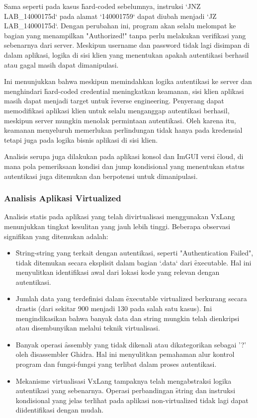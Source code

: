 Sama seperti pada kasus \f{hard-coded} sebelumnya, instruksi `JNZ LAB\_14000175d` pada alamat `140001759` dapat diubah menjadi `JZ LAB\_14000175d`. Dengan perubahan ini, program akan selalu melompat ke bagian yang menampilkan "Authorized!" tanpa perlu melakukan verifikasi yang sebenarnya dari server. Meskipun username dan password tidak lagi disimpan di dalam aplikasi, logika di sisi klien yang menentukan apakah autentikasi berhasil atau gagal masih dapat dimanipulasi.

Ini menunjukkan bahwa meskipun memindahkan logika autentikasi ke server dan menghindari \f{hard-coded credential} meningkatkan keamanan, sisi klien aplikasi masih dapat menjadi target untuk \f{reverse engineering}. Penyerang dapat memodifikasi aplikasi klien untuk selalu menganggap autentikasi berhasil, meskipun server mungkin menolak permintaan autentikasi. Oleh karena itu, keamanan menyeluruh memerlukan perlindungan tidak hanya pada kredensial tetapi juga pada logika bisnis aplikasi di sisi klien.

Analisis serupa juga dilakukan pada aplikasi konsol dan ImGUI versi \f{cloud}, di mana pola pemeriksaan kondisi dan jump kondisional yang menentukan status autentikasi juga ditemukan dan berpotensi untuk dimanipulasi.

\subsubsection{Analisis Aplikasi Virtualized}

Analisis statis pada aplikasi yang telah divirtualisasi menggunakan VxLang menunjukkan tingkat kesulitan yang jauh lebih tinggi. Beberapa observasi signifikan yang ditemukan adalah:

\begin{itemize}
  \item {} \f{String-string} yang terkait dengan autentikasi, seperti "Authentication Failed", tidak ditemukan secara eksplisit dalam bagian `.data` dari \f{executable}. Hal ini menyulitkan identifikasi awal dari lokasi kode yang relevan dengan autentikasi.
  \item {} Jumlah data yang terdefinisi dalam \f{executable} virtualized berkurang secara drastis (dari sekitar 900 menjadi 130 pada salah satu kasus). Ini mengindikasikan bahwa banyak data dan string mungkin telah dienkripsi atau disembunyikan melalui teknik virtualisasi.
  \item {} Banyak operasi \f{assembly} yang tidak dikenali atau dikategorikan sebagai '?' oleh \f{disassembler} Ghidra. Hal ini menyulitkan pemahaman alur kontrol program dan fungsi-fungsi yang terlibat dalam proses autentikasi.
  \item {} Mekanisme virtualisasi VxLang tampaknya telah mengabstraksi logika autentikasi yang sebenarnya. Operasi perbandingan \f{string} dan instruksi kondisional yang jelas terlihat pada aplikasi non-virtualized tidak lagi dapat diidentifikasi dengan mudah.
\end{itemize}

